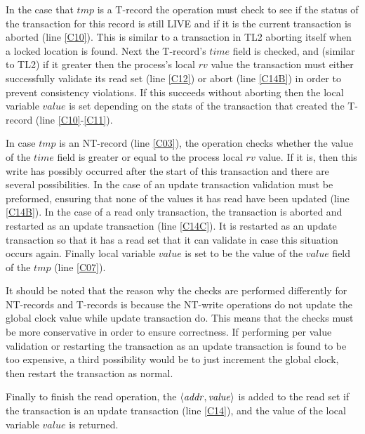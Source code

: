 In the case that $\mathit{tmp}$ is a T-record the operation must check to see
if the status of the transaction for this record is still LIVE and if it is
the current transaction is aborted (line \ref{C10}).
This is similar to a transaction in TL2 aborting itself when a locked location is found.
Next the T-record's $\mathit{time}$ field is checked, and (similar to TL2) if it 
greater then the process's local $\mathit{rv}$ value the transaction must
either successfully validate its read set (line \ref{C12}) or
abort (line \ref{C14B}) in order to prevent consistency violations.
If this succeeds without aborting then the local variable $\mathit{value}$
is set depending on the stats of the transaction that created the T-record (line \ref{C10}-\ref{C11}).

In case $\mathit{tmp}$ is an 
NT-record (line \ref{C03}), the operation
checks whether the value of the $\mathit{time}$ field is
greater or equal to the process local $\mathit{rv}$ value.
If it is, then this write has possibly occurred after the start of this
transaction and there are several possibilities.
In the case of an update transaction validation must be preformed, ensuring
that none of the values it has read have been updated (line \ref{C14B}).
In the case of a read only transaction, the transaction
is aborted and restarted as an update transaction (line \ref{C14C}).
It is restarted as an update transaction so that it has a read set that it can validate
in case this situation occurs again.
Finally local variable $\mathit{value}$ is set to be the value
of the $\mathit{value}$ field of the $\mathit{tmp}$ (line \ref{C07}).

It should be noted that the reason why the checks are performed differently
for NT-records and T-records is because the NT-write operations do not
update the global clock value while update transaction do.
This means that the checks must be more conservative in order to ensure correctness.
If performing per value validation or restarting the transaction as an update transaction
is found to be too expensive, a third possibility would be to just increment the global
clock, then restart the transaction as normal.

Finally to finish the read operation, the $\left \langle \mathit{addr, value} \right \rangle $
is added to the read set if the transaction is an update transaction (line \ref{C14}),
and the value of the local variable $\mathit{value}$  is returned.







